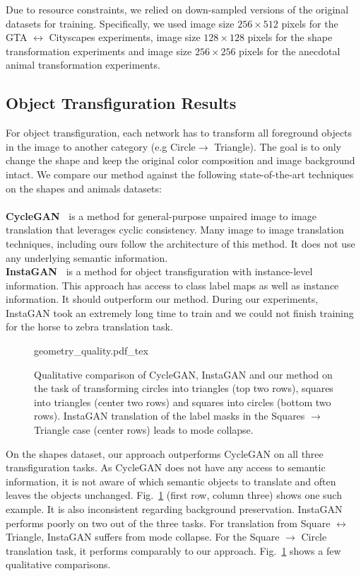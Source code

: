 Due to resource constraints, we relied on down-sampled versions of the original datasets for training. Specifically, we used image size $256 \times 512$ pixels for the GTA $\leftrightarrow$ Cityscapes experiments, image size $128 \times 128$ pixels for the shape transformation experiments and image size $256 \times 256$ pixels for the anecdotal animal transformation experiments.




\subsection{Object Transfiguration Results}
For object transfiguration, each network has to transform all foreground objects in the image to another category (e.g Circle$\to$ Triangle). The goal is to only change the shape and keep the original color composition and image background intact.
We compare our method against the following state-of-the-art techniques on the shapes and animals datasets:\\\\
\textbf{CycleGAN~\cite{zhu_unpaired_2017}} is a method for general-purpose unpaired image to image translation that leverages cyclic consistency. Many image to image translation techniques, including ours follow the architecture of this method. It does not use any underlying semantic information. \\
\textbf{InstaGAN~\cite{mo_instance-aware_2019}} is a method for object transfiguration with instance-level information. This approach has access to class label maps as well as instance information. It should outperform our method. During our experiments, InstaGAN took an extremely long time to train and we could not finish training for the horse to zebra translation task.

\begin{figure}[!hbpt]
    \centering
    \def\svgwidth{\columnwidth}
    {geometry_quality.pdf_tex}
    \caption[Qualitative comparison of CycleGAN, InstaGAN and our method on the shapes dataset.]{Qualitative comparison of CycleGAN, InstaGAN and our method on the task of transforming circles into triangles (top two rows), squares into triangles (center two rows) and squares into circles (bottom two rows). InstaGAN translation of the label masks in the Squares $\to$ Triangle case (center rows) leads to mode collapse.}
    \label{fig:geomaquality}
\end{figure}


On the shapes dataset, our approach outperforms CycleGAN on all three transfiguration tasks. As CycleGAN does not have any access to semantic information, it is not aware of which semantic objects to translate and often leaves the objects unchanged. Fig.~\ref{fig:geomaquality} (first row, column three) shows one such example. It is also inconsistent regarding background preservation. InstaGAN performs poorly on two out of the three tasks. For translation from Square $\leftrightarrow$ Triangle, InstaGAN suffers from mode collapse. For the Square $\to$ Circle translation task, it performs comparably to our approach. Fig.~\ref{fig:geomaquality} shows a few qualitative comparisons.

